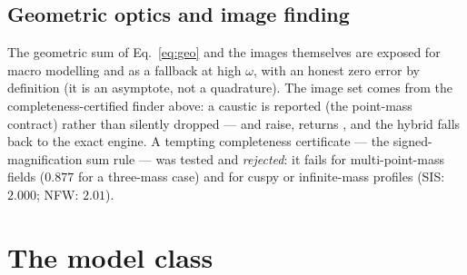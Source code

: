 \documentclass[11pt,a4paper]{article}
\begin{document}
\subsection{Geometric optics and image finding}
The geometric sum of Eq.~\eqref{eq:geo} and the images themselves are
exposed for macro modelling and as a fallback at high $\omega$, with an
honest zero error by definition (it is an asymptote, not a quadrature).  The
image set comes from the completeness-certified finder above: a caustic is
reported (the point-mass contract) rather than silently dropped ---
 and  raise, 
returns , and the hybrid falls back to the exact engine.  A
tempting completeness certificate --- the signed-magnification sum rule ---
was tested and \emph{rejected}: it fails for multi-point-mass fields
($0.877$ for a three-mass case) and for cuspy or infinite-mass profiles
(SIS: $2.000$; NFW: $2.01$).

\section{The model class}
\label{sec:model}
\end{document}
